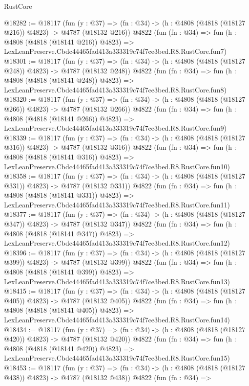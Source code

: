 \begin{lexlean}{RustCore}
\begin{coremodule}
@18282 := @18117
    (fun (y : @37) => (fn : @34) -> (h : @4808 (@4818 (@18127 @216)) @4823) -> @4787 (@18132 @216))
    @4822
    (fun (fn : @34) =>
    fun (h : @4808 (@4818 (@18141 @216)) @4823) =>
    LexLeanPreserve.Cbdc44465fad413a333319c74f7ce3bed.R8.RustCore.fun7)
@18301 := @18117
    (fun (y : @37) => (fn : @34) -> (h : @4808 (@4818 (@18127 @248)) @4823) -> @4787 (@18132 @248))
    @4822
    (fun (fn : @34) =>
    fun (h : @4808 (@4818 (@18141 @248)) @4823) =>
    LexLeanPreserve.Cbdc44465fad413a333319c74f7ce3bed.R8.RustCore.fun8)
@18320 := @18117
    (fun (y : @37) => (fn : @34) -> (h : @4808 (@4818 (@18127 @266)) @4823) -> @4787 (@18132 @266))
    @4822
    (fun (fn : @34) =>
    fun (h : @4808 (@4818 (@18141 @266)) @4823) =>
    LexLeanPreserve.Cbdc44465fad413a333319c74f7ce3bed.R8.RustCore.fun9)
@18339 := @18117
    (fun (y : @37) => (fn : @34) -> (h : @4808 (@4818 (@18127 @316)) @4823) -> @4787 (@18132 @316))
    @4822
    (fun (fn : @34) =>
    fun (h : @4808 (@4818 (@18141 @316)) @4823) =>
    LexLeanPreserve.Cbdc44465fad413a333319c74f7ce3bed.R8.RustCore.fun10)
@18358 := @18117
    (fun (y : @37) => (fn : @34) -> (h : @4808 (@4818 (@18127 @331)) @4823) -> @4787 (@18132 @331))
    @4822
    (fun (fn : @34) =>
    fun (h : @4808 (@4818 (@18141 @331)) @4823) =>
    LexLeanPreserve.Cbdc44465fad413a333319c74f7ce3bed.R8.RustCore.fun11)
@18377 := @18117
    (fun (y : @37) => (fn : @34) -> (h : @4808 (@4818 (@18127 @347)) @4823) -> @4787 (@18132 @347))
    @4822
    (fun (fn : @34) =>
    fun (h : @4808 (@4818 (@18141 @347)) @4823) =>
    LexLeanPreserve.Cbdc44465fad413a333319c74f7ce3bed.R8.RustCore.fun12)
@18396 := @18117
    (fun (y : @37) => (fn : @34) -> (h : @4808 (@4818 (@18127 @399)) @4823) -> @4787 (@18132 @399))
    @4822
    (fun (fn : @34) =>
    fun (h : @4808 (@4818 (@18141 @399)) @4823) =>
    LexLeanPreserve.Cbdc44465fad413a333319c74f7ce3bed.R8.RustCore.fun13)
@18415 := @18117
    (fun (y : @37) => (fn : @34) -> (h : @4808 (@4818 (@18127 @405)) @4823) -> @4787 (@18132 @405))
    @4822
    (fun (fn : @34) =>
    fun (h : @4808 (@4818 (@18141 @405)) @4823) =>
    LexLeanPreserve.Cbdc44465fad413a333319c74f7ce3bed.R8.RustCore.fun14)
@18434 := @18117
    (fun (y : @37) => (fn : @34) -> (h : @4808 (@4818 (@18127 @420)) @4823) -> @4787 (@18132 @420))
    @4822
    (fun (fn : @34) =>
    fun (h : @4808 (@4818 (@18141 @420)) @4823) =>
    LexLeanPreserve.Cbdc44465fad413a333319c74f7ce3bed.R8.RustCore.fun15)
@18453 := @18117
    (fun (y : @37) => (fn : @34) -> (h : @4808 (@4818 (@18127 @438)) @4823) -> @4787 (@18132 @438))
    @4822
    (fun (fn : @34) =>

\end{coremodule}
\end{lexlean}
